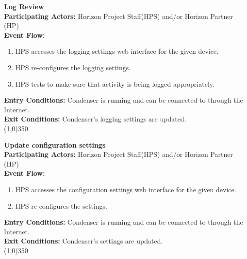 	\textbf{Log Review} \\	 
	\textbf{Participating Actors:} Horizon Project Staff(HPS) and/or Horizon Partner (HP) \\
	\textbf{Event Flow:}
	\begin{enumerate}
\item HPS accesses the logging settings web interface for the given device. 
\item HPS re-configures the logging settings.
\item HPS tests to make sure that activity is being logged appropriately.
    \end{enumerate}
	\textbf{Entry Conditions:} Condenser is running and can be connected to through the Internet.\\
	\textbf{Exit Conditions:} Condenser's logging settings are updated.\\
	\line(1,0){350}			
			 
	\textbf{Update configuration settings} \\	 
	\textbf{Participating Actors:} Horizon Project Staff(HPS) and/or Horizon Partner (HP) \\
	\textbf{Event Flow:}
	\begin{enumerate}
\item HPS accesses the configuration settings web interface for the given device. 
\item HPS re-configures the settings.
    \end{enumerate}
	\textbf{Entry Conditions:} Condenser is running and can be connected to through the Internet.\\
	\textbf{Exit Conditions:} Condenser's settings are updated.\\
	\line(1,0){350}			